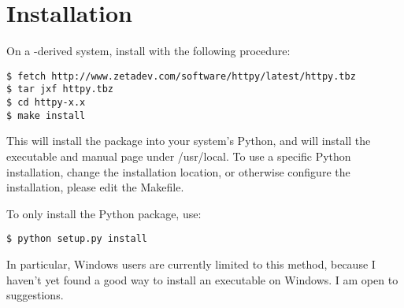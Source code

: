 \chapter{Installation}

On a \UNIX-derived system, install  with the following procedure:

\begin{verbatim}
$ fetch http://www.zetadev.com/software/httpy/latest/httpy.tbz
$ tar jxf httpy.tbz
$ cd httpy-x.x
$ make install
\end{verbatim}

This will install the  package into your system's Python, and will
install the executable and manual page under /usr/local. To use a specific
Python installation, change the installation location, or otherwise configure
the installation, please edit the Makefile.

To only install the Python package, use:

\begin{verbatim}
$ python setup.py install
\end{verbatim}

In particular, Windows users are currently limited to this method, because I
haven't yet found a good way to install an executable on Windows. I am open to
suggestions.

